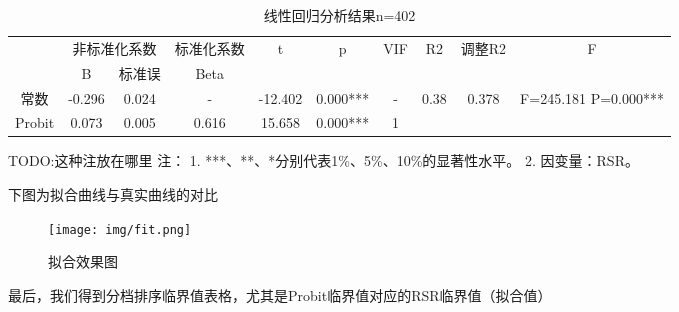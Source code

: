 \documentclass[UTF8]{ctexart}
\begin{document}
\begin{table*}[!ht]
	\centering
	\caption{线性回归分析结果n=402}
	\begin{tabular}{|c|c c|c|c|c|c|c|c|c|}
		\hline
		~      & \multicolumn{2}{|c|}{非标准化系数} & 标准化系数 & \multirow{2}{*}{t} & \multirow{2}{*}{p} & \multirow{2}{*}{VIF} & \multirow{2}{*}{R2} & \multirow{2}{*}{调整R2} & \multirow{2}{*}{F}                        \\
		~      & B                                  & 标准误     & Beta               & \multirow{2}{*}{}  & \multirow{2}{*}{}    & \multirow{2}{*}{}   & \multirow{2}{*}{}       & \multirow{2}{*}{}  & \multirow{2}{*}{}    \\ \hline
		常数   & -0.296                             & 0.024      & -                  & -12.402            & 0.000***             & -                   & 0.38                    & 0.378              & F=245.181 P=0.000*** \\ \hline
		Probit & 0.073                              & 0.005      & 0.616              & 15.658             & 0.000***             & 1                   & ~                       & ~                  & ~                    \\ \hline
	\end{tabular}
\end{table*}


TODO:这种注放在哪里
注：
1. ***、**、*分别代表1\%、5\%、10\%的显著性水平。
2. 因变量：RSR。

下图为拟合曲线与真实曲线的对比

\begin{figure}[H]\centering
	\texttt{[image: img/fit.png]} %
	\caption{拟合效果图} %
	\label{fig:figure 1} %
\end{figure}

最后，我们得到分档排序临界值表格，尤其是Probit临界值对应的RSR临界值（拟合值）
\end{document}
